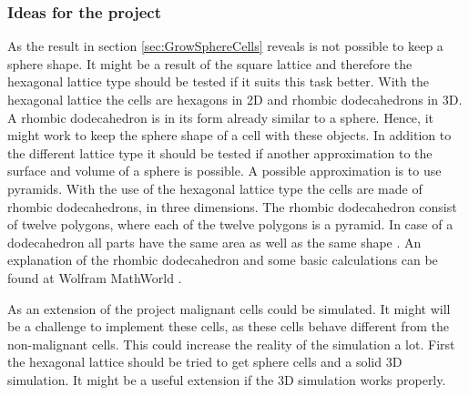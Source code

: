 \subsubsection{Ideas for the project}
As the result in section \ref{sec:GrowSphereCells} reveals is not possible to keep a sphere shape. It might be a result of the square lattice and therefore the hexagonal lattice type should be tested if it suits this task better. With the hexagonal lattice the cells are hexagons in 2D and rhombic dodecahedrons in 3D. A rhombic dodecahedron is in its form already similar to a sphere. Hence, it might work to keep the sphere shape of a cell with these objects. \newline
In addition to the different lattice type it should be tested if another approximation to the surface and volume of a sphere is possible. A possible approximation is to use pyramids. With the use of the hexagonal lattice type the cells are made of rhombic dodecahedrons, in three dimensions. The rhombic dodecahedron consist of twelve polygons, where each of the twelve polygons is a pyramid. In case of a dodecahedron all parts have the same area as well as the same shape \cite{Horn1984}. An explanation of the rhombic dodecahedron and some basic calculations can be found at Wolfram MathWorld \cite{RhombicDodecahedron.html}.


As an extension of the project malignant cells could be simulated. It might will be a challenge to implement these cells, as these cells behave different from the non-malignant cells. This could increase the reality of the simulation a lot. First the hexagonal lattice should be tried to get sphere cells and a solid 3D simulation. It might be a useful extension if the 3D simulation works properly.


